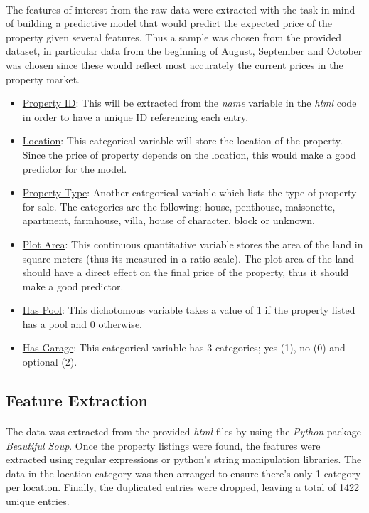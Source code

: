 \documentclass[12pt]{report}
\begin{document}
	\paragraph{ }The features of interest from the raw data were extracted with the task in mind of building a predictive model that would predict the expected price of the property given several features. Thus a sample was chosen from the provided dataset, in particular data from the beginning of August, September and October was chosen since these would reflect most accurately the current prices in the property market. 
	\begin{itemize}
		\item \underline{Property ID}: This will be extracted from the \textit{name} variable in the \textit{html} code in order to have a unique ID referencing each entry.
		\item \underline{Location}: This categorical variable will store the location of the property. Since the price of property depends on the location, this would make a good predictor for the model.
		\item \underline{Property Type}: Another categorical variable which lists the type of property for sale. The categories are the following: house, penthouse, maisonette, apartment, farmhouse, villa, house of character, block or unknown.
		\item \underline{Plot Area}: This continuous quantitative variable stores the area of the land in square meters (thus its measured in a ratio scale). The plot area of the land should have a direct effect on the final price of the property, thus it should make a good predictor.
		\item \underline{Has Pool}: This dichotomous variable takes a value of 1 if the property listed has a pool and 0 otherwise.
		\item \underline{Has Garage}: This categorical variable has 3 categories; yes (1), no (0) and optional (2).
	\end{itemize}

	\subsection{Feature Extraction}
	\paragraph{ }The data was extracted from the provided \textit{html} files by using the \textit{Python} package \textit{Beautiful Soup}. Once the property listings were found, the features were extracted using regular expressions or python's string manipulation libraries. The data in the location category was then arranged to ensure there's only 1 category per location. Finally, the duplicated entries were dropped, leaving a total of 1422 unique entries.
	
	\pagebreak
\end{document}
